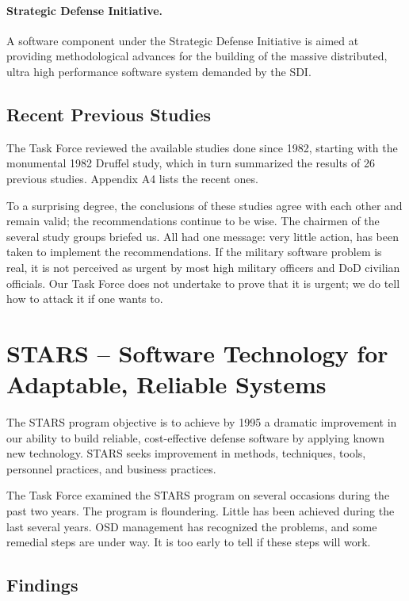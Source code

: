 \documentclass[12pt,final]{article}
\begin{document}
\paragraph{Strategic Defense Initiative.} A software component under the
Strategic Defense Initiative is aimed at providing methodological advances for
the building of the massive distributed, ultra high performance software system
demanded by the SDI.

\subsection{Recent Previous Studies}

The Task Force reviewed the available studies done since 1982, starting with
the monumental 1982 Druffel study, which in turn summarized the results of 26
previous studies. Appendix A4 lists the recent ones.

To a surprising degree, the conclusions of these studies agree with each other
and remain valid; the recommendations continue to be wise. The chairmen of the
several study groups briefed us. All had one message: very little action, has
been taken to implement the recommendations. If the military software problem
is real, it is not perceived as urgent by most high military officers and DoD
civilian officials. Our Task Force does not undertake to prove that it is
urgent; we do tell how to attack it if one wants to.

\section{STARS -- Software Technology for Adaptable, Reliable Systems}

The STARS program objective is to achieve by 1995 a dramatic improvement in our
ability to build reliable, cost-effective defense software by applying known
new technology.  STARS seeks improvement in methods, techniques, tools,
personnel practices, and business practices.

The Task Force examined the STARS program on several occasions during the past
two years. The program is floundering. Little has been achieved during the last
several years. OSD management has recognized the problems, and some remedial
steps are under way. It is too early to tell if these steps will work.

\subsection*{Findings}
\end{document}
